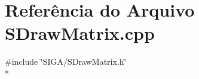 \section{Referência do Arquivo S\+Draw\+Matrix.\+cpp}
\label{_s_draw_matrix_8cpp}
{\ttfamily \#include \char`\"{}S\+I\+G\+A/\+S\+Draw\+Matrix.\+h\char`\"{}}\\*
